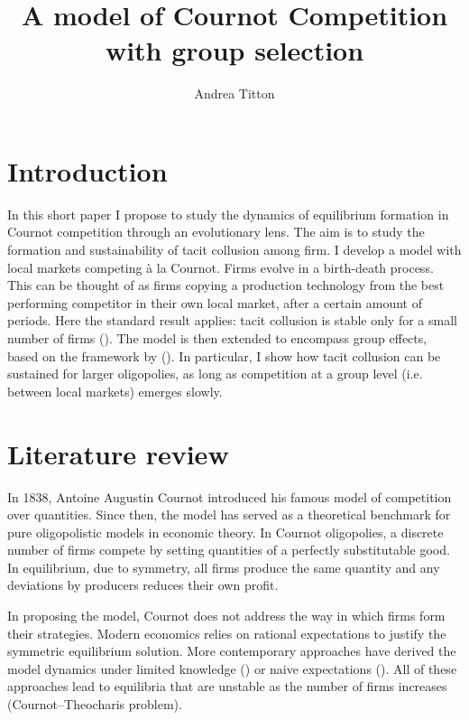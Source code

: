 \documentclass[american]{scrartcl}
\title{A model of Cournot Competition with group selection}
\author{Andrea Titton}
\newcommand{\citein}[1]{\citeauthor{#1} (\citeyear{#1})}
\begin{document}

\maketitle

\section{Introduction}



In this short paper I propose to study the dynamics of equilibrium formation in Cournot competition through an evolutionary lens. The aim is to study the formation and sustainability of tacit collusion among firm. I develop a model with local markets competing à la Cournot. Firms evolve in a birth-death process. This can be thought of as firms copying a production technology from the best performing competitor in their own local market, after a certain amount of periods. Here the standard result applies: tacit collusion is stable only for a small number of firms (\cite{Lampart2012}). The model is then extended to encompass group effects, based on the framework by \citein{Akdeniz2020}. In particular, I show how tacit collusion can be sustained for larger oligopolies, as long as competition at a group level (i.e. between local markets) emerges slowly.

\section{Literature review}

In 1838, Antoine Augustin Cournot introduced his famous model of competition over quantities. Since then, the model has served as a theoretical benchmark for pure oligopolistic models in economic theory. In Cournot oligopolies, a discrete number of firms compete by setting quantities of a perfectly substitutable good. In equilibrium, due to symmetry, all firms produce the same quantity and any deviations by producers reduces their own profit.

In proposing the model, Cournot does not address the way in which firms form their strategies. Modern economics relies on rational expectations to justify the symmetric equilibrium solution. More contemporary approaches have derived the model dynamics under limited knowledge (\cite{Bischi2015}) or naive expectations (\cite{Cnovas2008}). All of these approaches lead to equilibria that are unstable as the number of firms increases (Cournot–Theocharis problem).
\end{document}
